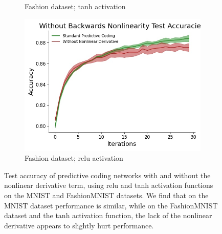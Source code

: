 \begin{figure}[ht]
\begin{subfigure}[b]{0.5\linewidth}
    \caption{\small Fashion dataset; tanh activation} 
  \end{subfigure}%
  \begin{subfigure}[b]{0.5\linewidth}
    \centering
    \includegraphics[width=0.75\linewidth]{chapter_3_figures/fashion_relu_Without_Backwards_Nonlinearity_Test_Accuracies_prelim_2.jpg} 
    \caption{\small Fashion dataset; relu activation} 
  \end{subfigure} 
  \caption{Test accuracy of predictive coding networks with and without the nonlinear derivative term, using relu and tanh activation functions on the MNIST and FashionMNIST datasets. We find that on the MNIST dataset performance is similar, while on the FashionMNIST dataset and the tanh activation function, the lack of the nonlinear derivative appears to slightly hurt performance.}
\end{figure} 
   
